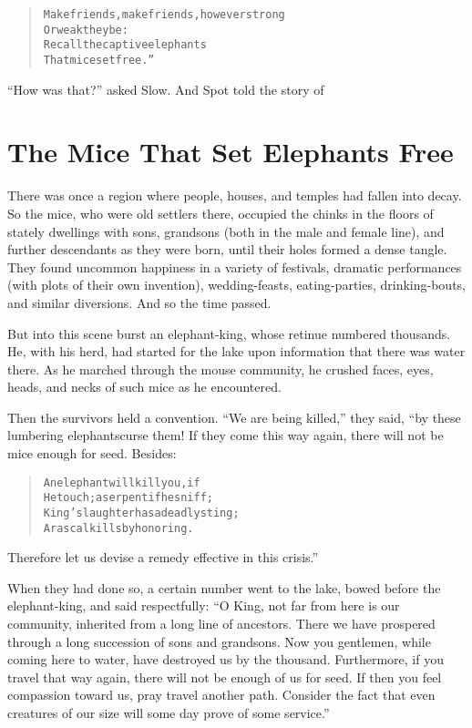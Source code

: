 \documentclass[article, twoside, 14pt]{memoir}
\renewenvironment{verbatim}{%
\begin{quote}%
\vskip -10pt%
\begin{alltt}\normalfont\large}{\end{alltt}%
\end{quote}%
\vskip -10pt
} %
\begin{document}
\begin{verbatim}
Make friends, make friends, however strong
    Or weak they be:
Recall the captive elephants
    That mice set free.”
\end{verbatim}
``How was that?'' asked Slow. And Spot told the story of

\chapter{The Mice That Set Elephants Free}

\label{s44}

There was once a region where people, houses, and temples had
fallen into decay. So the mice, who were old settlers there,
occupied the chinks in the floors of stately dwellings with sons,
grandsons (both in the male and female line), and further
descendants as they were born, until their holes formed a dense
tangle. They found uncommon happiness in a variety of festivals,
dramatic performances (with plots of their own invention),
wedding-feasts, eating-parties, drinking-bouts, and similar
diversions. And so the time passed.

But into this scene burst an elephant-king, whose retinue numbered
thousands. He, with his herd, had started for the lake upon
information that there was water there. As he marched through the
mouse community, he crushed faces, eyes, heads, and necks of
such mice as he encountered.

Then the survivors held a convention. ``We are being killed,'' they
said, “by these lumbering elephants{\textemdash}curse them! If they come this
way again, there will not be mice enough for seed. Besides:

\begin{verbatim}
An elephant will kill you, if
He touch; a serpent if he sniff;
King's laughter has a deadly sting;
A rascal kills by honoring.
\end{verbatim}
Therefore let us devise a remedy effective in this crisis.”

When they had done so, a certain number went to the lake, bowed
before the elephant-king, and said respectfully:
``O King, not far from here is our community, inherited from a long line of ancestors. There we have prospered through a long succession of sons and grandsons. Now you gentlemen, while coming here to water, have destroyed us by the thousand. Furthermore, if you travel that way again, there will not be enough of us for seed. If then you feel compassion toward us, pray travel another path. Consider the fact that even creatures of our size will some day prove of some service.''
\end{document}
